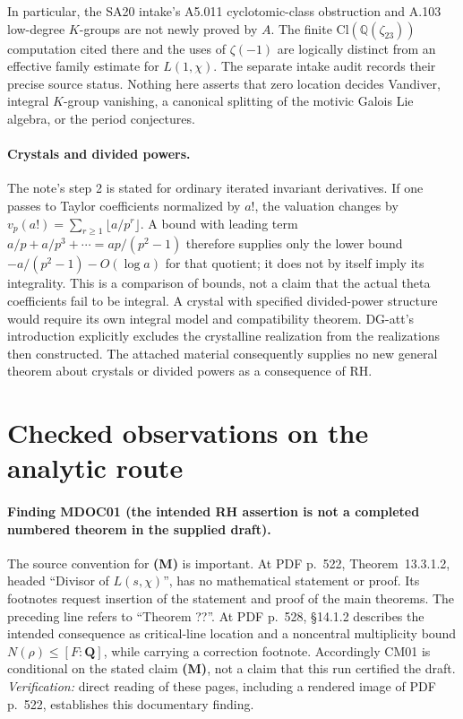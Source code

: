 \documentclass[11pt,a4paper]{article}
\theoremstyle{definition}
\begin{document}
In particular, the SA20 intake's A5.011 cyclotomic-class obstruction and
A.103 low-degree \(K\)-groups are not newly proved by \(A\).
The finite \(\mathrm{Cl}(\mathbb Q(\zeta_{23}))\) computation cited there
and the uses of \(\zeta(-1)\) are logically distinct from an effective
family estimate for \(L(1,\chi)\).  The separate intake audit records their
precise source status.  Nothing here asserts that zero location decides
Vandiver, integral \(K\)-group vanishing, a canonical splitting of the
motivic Galois Lie algebra, or the period conjectures.

\paragraph{Crystals and divided powers.}
The note's step 2 is stated for ordinary iterated invariant derivatives.
If one passes to Taylor coefficients normalized by \(a!\), the valuation
changes by \(v_p(a!)=\sum_{r\geq1}\lfloor a/p^r\rfloor\).  A bound with
leading term \(a/p+a/p^3+\cdots=ap/(p^2-1)\) therefore supplies only the
lower bound \(-a/(p^2-1)-O(\log a)\) for that quotient; it does not by
itself imply its integrality.  This is a comparison of bounds, not a claim
that the actual theta coefficients fail to be integral.  A crystal with
specified divided-power structure would require its own integral model and
compatibility theorem.  DG-att's introduction explicitly excludes the
crystalline realization from the realizations then constructed.  The
attached material consequently supplies no new general theorem about
crystals or divided powers as a consequence of RH.



\section{Checked observations on the analytic route}


\paragraph{Finding MDOC01 (the intended RH assertion is not a completed
numbered theorem in the supplied draft).}
The source convention for \textbf{(M)} is important. At PDF p.~522,
Theorem~13.3.1.2, headed ``Divisor of $L(s,\chi)$'', has no mathematical
statement or proof. Its footnotes request insertion of the statement and
proof of the main theorems. The preceding line refers to ``Theorem ??''.
At PDF p.~528, \S14.1.2 describes the intended consequence as critical-line
location and a noncentral multiplicity bound $N(\rho)\le[F:\mathbf Q]$,
while carrying a correction footnote. Accordingly CM01 is conditional on
the stated claim \textbf{(M)}, not a claim that this run certified the draft.
\emph{Verification:} direct reading of these pages, including a rendered
image of PDF p.~522, establishes this documentary finding.
\end{document}
